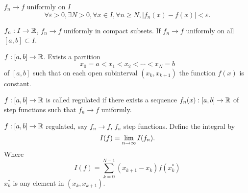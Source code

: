 \documentclass[10pt, a4paper]{article}
\begin{document}
\begin{definition}
    $f_n \to f$ uniformly on $I$
    \[
    \forall\varepsilon > 0, \exists N > 0, \forall x \in I, \forall n \geq N, |f_n(x) - f(x)| < \varepsilon.
    \]
\end{definition}

\begin{definition}
    $f_n : I \to \mathbb{R}$,
    $f_n \to f$ uniformly in compact subsets.
    If $f_n \to f$ uniformly on all $[a, b] \subset I$.
\end{definition}

\begin{definition}
    $f : [a, b] \to \mathbb{R}$.
    Exists a partition
    \[
    x_0 = a < x_1 < x_2 < \dotsi < x_N = b
    \]
    of $[a, b]$ such that on each open subinterval $(x_k, x_{k + 1})$ the function $f(x)$ is constant.
\end{definition}

\begin{definition}
    $f : [a, b] \to \mathbb{R}$ is called regulated if there exists a sequence $f_n(x) : [a, b] \to \mathbb{R}$ of step functions such that $f_n \to f$ uniformly.
\end{definition}

\begin{definition}
    $f : [a, b] \to \mathbb{R}$ regulated,
    say $f_n \to f$,
    $f_n$ step functions.
    Define the integral by
    \[
    I(f) = \lim_{n \rightarrow \infty} I(f_n).
    \]
    Where
    \[
    I(f) = \sum_{k = 0}^{N - 1}(x_{k + 1} - x_k)f(x_k ^ {*})
    \]
    $x_k ^ {*}$ is any element in $(x_k, x_{k + 1})$.
\end{definition}
\end{document}
